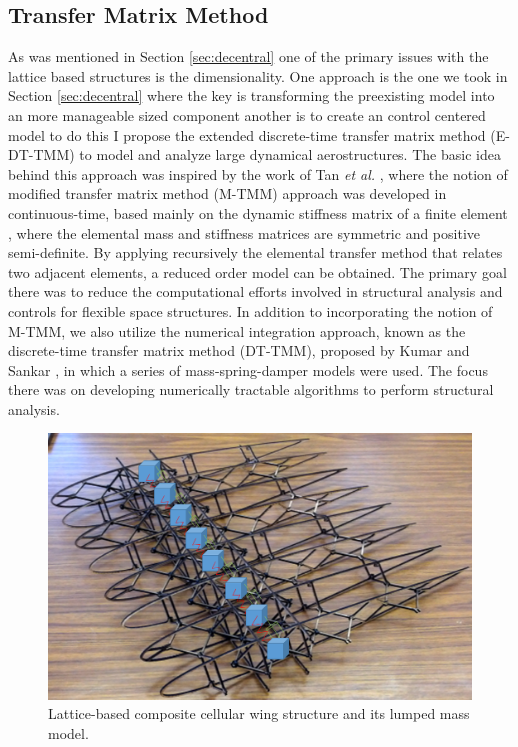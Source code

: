 \documentclass[11pt]{ucthesis}
\begin{document}
\subsection{Transfer Matrix Method}
As was mentioned in Section \ref{sec:decentral} one of the primary issues with the lattice based structures is the dimensionality. One approach is the one we took in Section \ref{sec:decentral} where the key is transforming the preexisting model into an more manageable sized component another is to create an control centered model to do this I propose the extended discrete-time transfer matrix method (E-DT-TMM) to model and analyze large dynamical aerostructures. The basic idea behind this approach was inspired by the work of Tan {\it et al.} \cite{tan1990modified}, where the notion of modified transfer matrix method (M-TMM) approach was developed in continuous-time, based mainly on the dynamic stiffness matrix of a finite element \cite{degen1985combined}, where the elemental mass and stiffness matrices are symmetric and positive semi-definite. By applying recursively the elemental transfer method that relates two adjacent elements, a reduced order model can be obtained. The primary goal there was to reduce the computational efforts involved in structural analysis and controls for flexible space structures. In addition to incorporating the notion of M-TMM, we also utilize the numerical integration approach, known as the discrete-time transfer matrix method (DT-TMM), proposed by Kumar and Sankar \cite{kumar1986new}, in which a series of mass-spring-damper models were used. The focus there was on developing numerically tractable algorithms to perform structural analysis.

\begin{figure}[h]
\centering
\includegraphics[width=1\linewidth]{Figures/WingLump.png}
\caption{Lattice-based composite cellular wing structure and its lumped mass model.}
\label{fig:lumpwing}
\end{figure}
\end{document}
